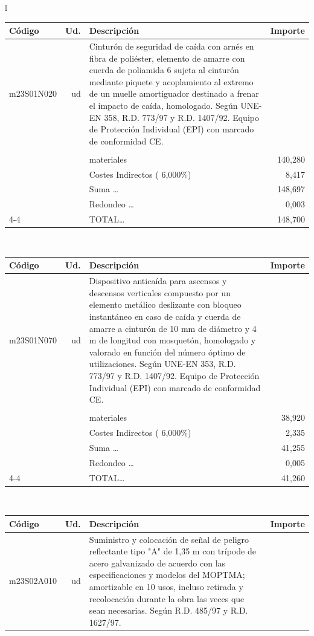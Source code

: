 \documentclass{book}%
\begin{document}
\begin{longtable}{l}
\begin{tabular}{l r p{60mm} r}%
Código&Ud.&Descripción&Importe\\%
\hline%
m23S01N020&ud&Cinturón de seguridad de caída con arnés en fibra de poliéster, elemento de amarre con cuerda de poliamida 6 sujeta al cinturón mediante piquete y acoplamiento al extremo de un muelle amortiguador destinado a frenar el impacto de caída, homologado. Según UNE{-}EN 358, R.D. 773/97 y R.D. 1407/92. Equipo de Protección Individual (EPI) con marcado de conformidad CE.&\\%
&&&\\%
&&materiales&   140,280\\%
&&Costes Indirectos (     6,000\%)&     8,417\\%
&&Suma \ldots&   148,697\\%
&&Redondeo \ldots&     0,003\\%
\cline{4-4}%
&&TOTAL\ldots&   148,700\\%
\end{tabular}\\%
\begin{tabular}{l r p{60mm} r}%
Código&Ud.&Descripción&Importe\\%
\hline%
m23S01N070&ud&Dispositivo anticaída para ascensos y descensos verticales compuesto por un elemento metálico deslizante con bloqueo instantáneo en caso de caída y cuerda de amarre a cinturón de 10 mm de diámetro y 4 m de longitud con mosquetón, homologado y valorado en función del número óptimo de utilizaciones. Según UNE{-}EN 353, R.D. 773/97 y R.D. 1407/92. Equipo de Protección Individual (EPI) con marcado de conformidad CE.&\\%
&&&\\%
&&materiales&    38,920\\%
&&Costes Indirectos (     6,000\%)&     2,335\\%
&&Suma \ldots&    41,255\\%
&&Redondeo \ldots&     0,005\\%
\cline{4-4}%
&&TOTAL\ldots&    41,260\\%
\end{tabular}\\%
\begin{tabular}{l r p{60mm} r}%
Código&Ud.&Descripción&Importe\\%
\hline%
m23S02A010&ud&Suministro y colocación de señal de peligro reflectante tipo "A" de 1,35 m con trípode de acero galvanizado de acuerdo con las especificaciones y modelos del MOPTMA; amortizable en 10 usos, incluso retirada y recolocación durante la obra las veces que sean necesarias. Según R.D. 485/97 y R.D. 1627/97.&\\%

\end{tabular}
\end{longtable}
\end{document}
